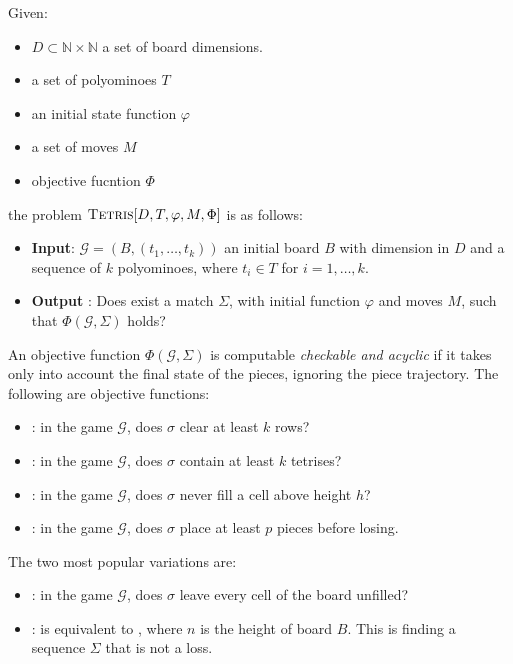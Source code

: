 \begin{definition} 
  Given: 
  \begin{itemize}
    \item $D \subset \mathbb{N} \times \mathbb{N}$ a set of board dimensions.
    \item a set of polyominoes $T$
    \item an initial state function $\varphi$
    \item a set of moves $M$
    \item objective fucntion $\Phi$
  \end{itemize}
    the problem $\textsc{Tetris}[D,T,\varphi,M,\Phi]$ is as follows:
  
  \begin{itemize}
    \item \textbf{Input}: $\mathcal{G} = (B,(t_1,\dots,t_k))$ an initial board $B$ with dimension in $D$ and a sequence of $k$ polyominoes, where $t_i \in T$ for $i = 1,\dots,k$.
    
    \item \textbf{Output} : Does exist a match $\Sigma$, with initial function $\varphi$ and moves $M$, such that $\Phi ( \mathcal{G}, \Sigma )$ holds? 
  \end{itemize}


\end{definition}

An objective function $\Phi(\mathcal{G},\Sigma)$ is computable \emph{checkable and acyclic} if it takes only into account the final state of the pieces, ignoring the piece trajectory. The following are objective functions:

\begin{itemize}
  \item {}: in the game $\mathcal{G}$, does $\sigma$ clear at least $k$ rows?
  \item {}: in the game $\mathcal{G}$, does $\sigma$ contain at least $k$ tetrises?
  \item {}: in the game $\mathcal{G}$, does $\sigma$ never fill a cell above height $h$?
  \item {}: in the game $\mathcal{G}$, does $\sigma$ place at least $p$ pieces before losing.
\end{itemize} 

The two most popular variations are:

\begin{itemize} \index{\clearing} \index{\survival}
  \item \clearing: in the game $\mathcal{G}$, does $\sigma$ leave every cell of the board unfilled?
  \item \survival: is equivalent to , where $n$ is the height of board $B$. This is finding a sequence $\Sigma$ that is not a loss.
\end{itemize}

